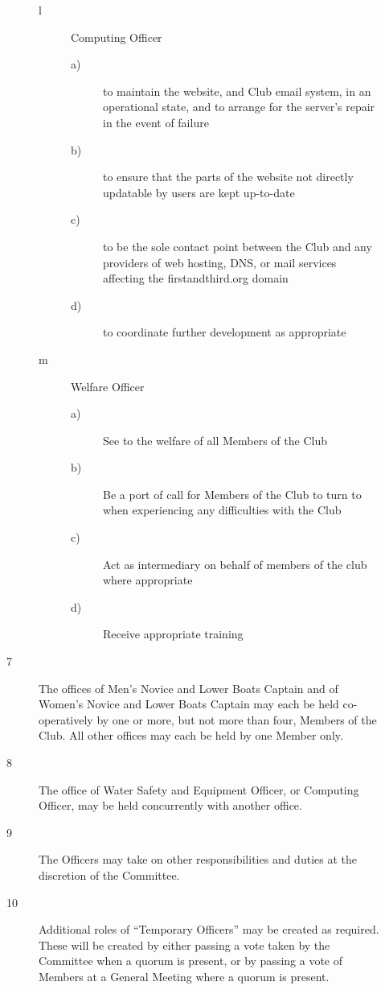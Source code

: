 \documentclass{article}
\begin{document}
\begin{description}
\begin{description}
\begin{description}
		\item[l] Computing Officer
		\begin{description}
			\item[a)] to maintain the website, and Club email system, in an
			operational state, and to arrange for the server's repair in the
			event of failure
			\item[b)] to ensure that the parts of the website not directly updatable by
			users are kept up-to-date
			\item[c)]to be the sole contact point between the Club and any providers
			of web hosting, DNS, or mail services affecting the
			firstandthird.org domain
			\item[d)] to coordinate further development as appropriate
		\end{description}
	
		\item[m] Welfare Officer
		\begin{description}
			\item[a)] See to the welfare of all Members of the Club
			\item[b)] Be a port of call for Members of the Club to turn to when
			experiencing any difficulties with the Club
			\item[c)] Act as intermediary on behalf of members of the club where
			appropriate
			\item[d)] Receive appropriate training
		\end{description}
		\end{description}
		\item[7] The offices of Men's Novice and Lower Boats Captain and of Women’s
		Novice and Lower Boats Captain may each be held co-operatively by one or
		more, but not more than four, Members of the Club. All other offices may
		each be held by one Member only.\\
		
		\item[8] The office of Water Safety and Equipment Officer, or Computing Officer, may
		be held concurrently with another office.\\
		
		\item[9] The Officers may take on other responsibilities and duties at the discretion of
		the Committee.\\
		
		\item[10] Additional roles of “Temporary Officers” may be created as required. These
		will be created by either passing a vote taken by the Committee when a
		quorum is present, or by passing a vote of Members at a General Meeting
		where a quorum is present.\\
		

\end{description}
\end{description}
\end{document}
